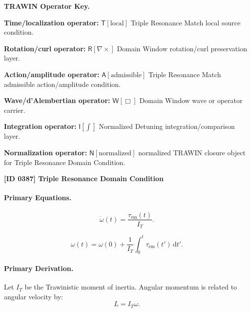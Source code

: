 \par\vspace{0.45\baselineskip}
\noindent\begin{minipage}[t]{\linewidth}
\begingroup
\small
\raggedright
\textbf{TRAWIN Operator Key.}\par
\noindent\textbf{Time/localization operator:} $\mathsf{T}\!\left[\mathrm{local}\right]$ Triple Resonance Match local source condition.\par
\noindent\textbf{Rotation/curl operator:} $\mathsf{R}\!\left[\nabla\times\right]$ Domain Window rotation/curl preservation layer.\par
\noindent\textbf{Action/amplitude operator:} $\mathsf{A}\!\left[\mathrm{admissible}\right]$ Triple Resonance Match admissible action/amplitude condition.\par
\noindent\textbf{Wave/d'Alembertian operator:} $\mathsf{W}\!\left[\Box\right]$ Domain Window wave or operator carrier.\par
\noindent\textbf{Integration operator:} $\mathsf{I}\!\left[\int\right]$ Normalized Detuning integration/comparison layer.\par
\noindent\textbf{Normalization operator:} $\mathsf{N}\!\left[\mathrm{normalized}\right]$ normalized TRAWIN closure object for Triple Resonance Domain Condition.\par
\endgroup
\end{minipage}

\clearpage
\noindent\textbf{[ID 0387] Triple Resonance Domain Condition}\par
\vspace{0.35em}
\paragraph{Primary Equations.}
\begin{equation}
\dot{\omega}(t)
=
\frac{\tau_{\mathrm{em}}(t)}{I_T}.
\end{equation}

\begin{equation}
\omega(t)
=
\omega(0)
+
\frac{1}{I_T}
\int_0^t
\tau_{\mathrm{em}}(t')
\,\mathrm{d}t' .
\end{equation}

\paragraph{Primary Derivation.}
Let $I_T$ be the Trawinistic moment of inertia.  
Angular momentum is related to angular velocity by:
\begin{equation}
L=I_T\omega .
\end{equation}

